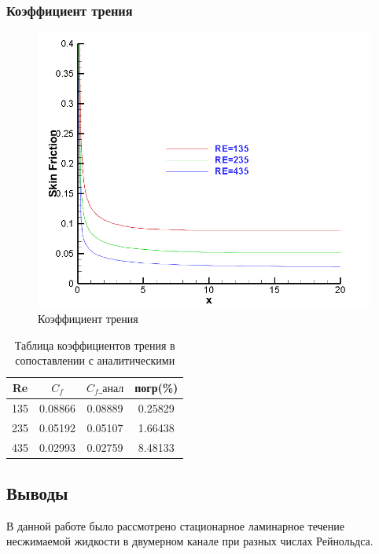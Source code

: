 \documentclass[12pt, a4paper]{article}
\begin{document}
\subsubsection{Коэффициент трения}
\begin{figure}[H]
    \centering
    \includegraphics[scale = 0.6]{figure/SkinFriction_RE=all_1.png}
    \caption{Коэффициент трения}
    \label{pic10}
\end{figure}

\begin{table}[H]
    \centering
    \begin{tabular}{|c|c|c|c|}
    \hline
        Re  &  $C_f$  &  $C_f\_{\text{анал}}$  &  погр(\%)\\
    \hline
        135  &  0.08866  &  0.08889  &  0.25829\\
    \hline
        235  &  0.05192  &  0.05107  &  1.66438\\
    \hline
        435  &  0.02993  &  0.02759  &  8.48133\\
    \hline
    \end{tabular}
    \caption{Таблица коэффициентов трения в сопоставлении с аналитическими}
    \label{tab3}
\end{table}

\newpage
\subsection{Выводы}
В данной работе было рассмотрено стационарное ламинарное течение несжимаемой жидкости в двумерном канале при разных числах Рейнольдса.
\end{document}
